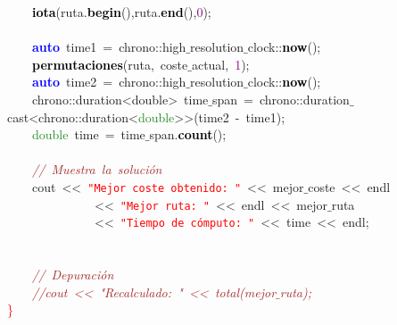 \mbox{}\ \ \ \ \textbf{\textcolor{Black}{iota}}\textcolor{BrickRed}{(}ruta\textcolor{BrickRed}{.}\textbf{\textcolor{Black}{begin}}\textcolor{BrickRed}{(),}ruta\textcolor{BrickRed}{.}\textbf{\textcolor{Black}{end}}\textcolor{BrickRed}{(),}\textcolor{Purple}{0}\textcolor{BrickRed}{);} \\
\mbox{} \\
\mbox{}\ \ \ \ \textbf{\textcolor{Blue}{auto}}\ time1\ \textcolor{BrickRed}{=}\ chrono\textcolor{BrickRed}{::}high$\_$resolution$\_$clock\textcolor{BrickRed}{::}\textbf{\textcolor{Black}{now}}\textcolor{BrickRed}{();} \\
\mbox{}\ \ \ \ \textbf{\textcolor{Black}{permutaciones}}\textcolor{BrickRed}{(}ruta\textcolor{BrickRed}{,}\ coste$\_$actual\textcolor{BrickRed}{,}\ \textcolor{Purple}{1}\textcolor{BrickRed}{);} \\
\mbox{}\ \ \ \ \textbf{\textcolor{Blue}{auto}}\ time2\ \textcolor{BrickRed}{=}\ chrono\textcolor{BrickRed}{::}high$\_$resolution$\_$clock\textcolor{BrickRed}{::}\textbf{\textcolor{Black}{now}}\textcolor{BrickRed}{();} \\
\mbox{}\ \ \ \ chrono\textcolor{BrickRed}{::}\textcolor{TealBlue}{duration\textless{}double\textgreater{}}\ time$\_$span\ \textcolor{BrickRed}{=}\ chrono\textcolor{BrickRed}{::}duration$\_$cast\textcolor{BrickRed}{\textless{}}chrono\textcolor{BrickRed}{::}duration\textcolor{BrickRed}{\textless{}}\textcolor{ForestGreen}{double}\textcolor{BrickRed}{\textgreater{}\textgreater{}(}time2\ \textcolor{BrickRed}{-}\ time1\textcolor{BrickRed}{);} \\
\mbox{}\ \ \ \ \textcolor{ForestGreen}{double}\ time\ \textcolor{BrickRed}{=}\ time$\_$span\textcolor{BrickRed}{.}\textbf{\textcolor{Black}{count}}\textcolor{BrickRed}{();} \\
\mbox{} \\
\mbox{}\ \ \ \ \textit{\textcolor{Brown}{//\ Muestra\ la\ solución}} \\
\mbox{}\ \ \ \ cout\ \textcolor{BrickRed}{\textless{}\textless{}}\ \texttt{\textcolor{Red}{"{}Mejor\ coste\ obtenido:\ "{}}}\ \textcolor{BrickRed}{\textless{}\textless{}}\ mejor$\_$coste\ \textcolor{BrickRed}{\textless{}\textless{}}\ endl \\
\mbox{}\ \ \ \ \ \ \ \ \ \ \ \ \ \ \textcolor{BrickRed}{\textless{}\textless{}}\ \texttt{\textcolor{Red}{"{}Mejor\ ruta:\ "{}}}\ \textcolor{BrickRed}{\textless{}\textless{}}\ endl\ \textcolor{BrickRed}{\textless{}\textless{}}\ mejor$\_$ruta \\
\mbox{}\ \ \ \ \ \ \ \ \ \ \ \ \ \ \textcolor{BrickRed}{\textless{}\textless{}}\ \texttt{\textcolor{Red}{"{}Tiempo\ de\ cómputo:\ "{}}}\ \textcolor{BrickRed}{\textless{}\textless{}}\ time\ \textcolor{BrickRed}{\textless{}\textless{}}\ endl\textcolor{BrickRed}{;} \\
\mbox{}\ \ \ \  \\
\mbox{}\ \ \ \  \\
\mbox{}\ \ \ \ \textit{\textcolor{Brown}{//\ Depuración}} \\
\mbox{}\ \ \ \ \textit{\textcolor{Brown}{//cout\ \textless{}\textless{}\ "{}Recalculado:\ "{}\ \textless{}\textless{}\ total(mejor$\_$ruta);}} \\
\mbox{}\textcolor{Red}{\}} \\
\mbox{}
